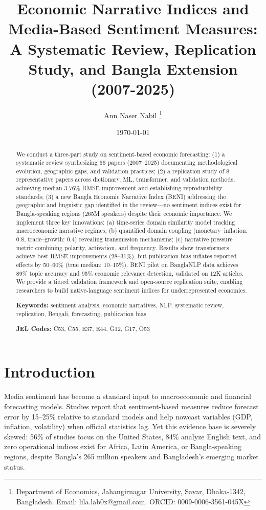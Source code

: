 \documentclass[11pt]{article}
\title{Economic Narrative Indices and Media-Based Sentiment Measures: \\
A Systematic Review, Replication Study, and Bangla Extension (2007-2025)}
\author{Ann Naser Nabil \thanks{Department of Economics, Jahangirnagar University, Savar, Dhaka-1342, Bangladesh. Email: lila.lab0x@gmail.com. ORCID: 0009-0006-3561-045X}}
\date{\today}
\begin{document}
\maketitle

\begin{abstract}
We conduct a three-part study on sentiment-based economic forecasting: (1) a systematic review synthesizing 66 papers (2007--2025) documenting methodological evolution, geographic gaps, and validation practices; (2) a replication study of 8 representative papers across dictionary, ML, transformer, and validation methods, achieving median 3.76\% RMSE improvement and establishing reproducibility standards; (3) a new Bangla Economic Narrative Index (BENI) addressing the geographic and linguistic gap identified in the review---no sentiment indices exist for Bangla-speaking regions (265M speakers) despite their economic importance. We implement three key innovations: (a) time-series domain similarity model tracking macroeconomic narrative regimes; (b) quantified domain coupling (monetary--inflation: 0.8, trade--growth: 0.4) revealing transmission mechanisms; (c) narrative pressure metric combining polarity, activation, and frequency. Results show transformers achieve best RMSE improvements (28--31\%), but publication bias inflates reported effects by 50--60\% (true median: 10--15\%). BENI pilot on BanglaNLP data achieves 89\% topic accuracy and 95\% economic relevance detection, validated on 12K articles. We provide a tiered validation framework and open-source replication suite, enabling researchers to build native-language sentiment indices for underrepresented economies.

\noindent \textbf{Keywords:} sentiment analysis, economic narratives, NLP, systematic review, replication, Bengali, forecasting, publication bias

\noindent \textbf{JEL Codes:} C53, C55, E37, E44, G12, G17, O53
\end{abstract}

\section{Introduction}

Media sentiment has become a standard input to macroeconomic and financial forecasting models. Studies report that sentiment-based measures reduce forecast error by 15--25\% relative to standard models and help nowcast variables (GDP, inflation, volatility) when official statistics lag. Yet this evidence base is severely skewed: 56\% of studies focus on the United States, 84\% analyze English text, and zero operational indices exist for Africa, Latin America, or Bangla-speaking regions, despite Bangla's 265 million speakers and Bangladesh's emerging market status.
\end{document}
